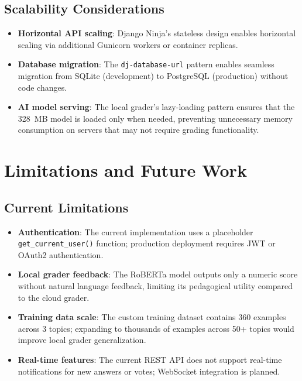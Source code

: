 \documentclass[conference]{IEEEtran}
\begin{document}
\subsection{Scalability Considerations}
\begin{itemize}[leftmargin=*]
    \item \textbf{Horizontal API scaling}: Django Ninja's stateless design enables horizontal scaling via additional Gunicorn workers or container replicas.
    \item \textbf{Database migration}: The \texttt{dj-database-url} pattern enables seamless migration from SQLite (development) to PostgreSQL (production) without code changes.
    \item \textbf{AI model serving}: The local grader's lazy-loading pattern ensures that the 328~MB model is loaded only when needed, preventing unnecessary memory consumption on servers that may not require grading functionality.
\end{itemize}

\section{Limitations and Future Work}

\subsection{Current Limitations}
\begin{itemize}[leftmargin=*]
    \item \textbf{Authentication}: The current implementation uses a placeholder \texttt{get\_current\_user()} function; production deployment requires JWT or OAuth2 authentication.
    \item \textbf{Local grader feedback}: The RoBERTa model outputs only a numeric score without natural language feedback, limiting its pedagogical utility compared to the cloud grader.
    \item \textbf{Training data scale}: The custom training dataset contains 360 examples across 3 topics; expanding to thousands of examples across 50+ topics would improve local grader generalization.
    \item \textbf{Real-time features}: The current REST API does not support real-time notifications for new answers or votes; WebSocket integration is planned.
\end{itemize}
\end{document}
